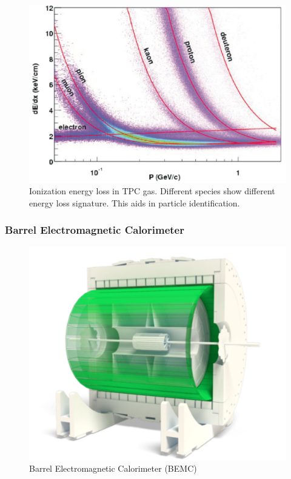 \documentclass[letterpaper, abstract = on,listof=totoc, bibliography=totoc]{scrreprt}
\begin{document}
\begin{figure}
\begin{center}
\includegraphics[width = 1\textwidth]{tpc_dEdx}
\caption[Ionization energy loss in TPC gas]{Ionization energy loss in TPC gas. Different species show different energy loss signature. This aids in particle identification.}
\label{fig:tpc_dEdx}
\end{center}
\end{figure}

\FloatBarrier
\subsubsection[BEMC]{Barrel Electromagnetic Calorimeter}


\begin{figure}[h!]
\begin{center}
\includegraphics[width = .7\textwidth]{BEMC}
\caption[BEMC]{Barrel Electromagnetic Calorimeter (BEMC)}
\label{fig:BEMC}
\end{center}
\end{figure}
\end{document}
